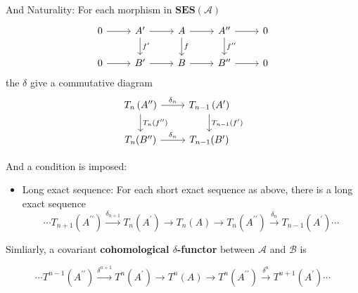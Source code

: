 \documentclass[12pt, oneside]{book}
\begin{document}
\begin{definition}
\begin{itemize}
\begin{remark}
                  And Naturality:
                  For each morphism in $\mathbf{SES}\left(\mathcal{A}\right)$
                  \begin{equation*}
                      \begin{tikzcd}
                          0 \arrow{r} & A^\prime \arrow{r} \arrow[d ,"f^{\prime}"] & A \arrow{r} \arrow[d ,"f"] & A^{\prime\prime} \arrow{r} \arrow[d ,"f^{\prime\prime}"] & 0 \\
                          0 \arrow{r} & B^{\prime} \arrow{r} & B \arrow{r} & B^{\prime\prime} \arrow{r} & 0
                      \end{tikzcd}
                  \end{equation*}
                  the $\delta$ give a commutative diagram
                  \begin{equation*}
                      \begin{tikzcd}
                          T_n\left(A^{\prime\prime}\right) \arrow{r}{\delta_n} \arrow[d,"T_n(f^{\prime\prime})"]  & T_{n-1}\left(A^{\prime}\right) \arrow[d,"T_{n-1}(f^{\prime})"] \\
                          T_n(B^{\prime\prime}) \arrow{r}{\delta_n} & T_{n-1}(B^{\prime})
                      \end{tikzcd}
                  \end{equation*}
              \end{remark}
    \end{itemize}
    And a condition is imposed:
    \begin{itemize}
        \item
              Long exact sequence:
              For each short exact sequence as above, there is a long exact sequence
              \begin{equation*}
                  \cdots T_{n+1}(A^{\prime\prime}) \xrightarrow{\delta_{n+1}} T_n(A^\prime) \rightarrow T_n(A) \rightarrow T_n(A^{\prime\prime}) \xrightarrow{\delta_n} T_{n-1}(A^\prime) \cdots
              \end{equation*}
    \end{itemize}
\end{definition}

\begin{definition}
    Simliarly, a covariant \textbf{cohomological $\delta$-functor} between $\mathcal{A}$ and $\mathcal{B}$ is

    \begin{equation*}
        \cdots T^{n-1}(A^{\prime\prime}) \xrightarrow{\delta^{n+1}} T^n(A^{\prime}) \rightarrow T^n(A) \rightarrow T^n(A^{\prime\prime}) \xrightarrow{\delta^n} T^{n+1}(A^{\prime}) \cdots
    \end{equation*}
\end{definition}
\end{document}
